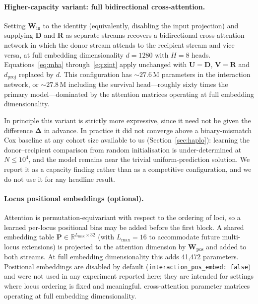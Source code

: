 \documentclass[11pt,a4paper]{article}
\begin{document}
\paragraph{Higher-capacity variant: full bidirectional cross-attention.}
Setting $\mathbf{W}_{\mathrm{in}}$ to the identity (equivalently, disabling the
input projection) and supplying $\mathbf{D}$ and $\mathbf{R}$ as separate
streams recovers a bidirectional cross-attention network in which the donor
stream attends to the recipient stream and vice versa, at full embedding
dimensionality $d = 1280$ with $H = 8$ heads.  Equations~\eqref{eq:mha}
through~\eqref{eq:zint} apply unchanged with $\mathbf{U} = \mathbf{D}$,
$\mathbf{V} = \mathbf{R}$ and $d_{\mathrm{proj}}$ replaced by $d$.  This
configuration has ${\sim}27.6$\,M parameters in the interaction network, or
${\sim}27.8$\,M including the survival head---roughly sixty times the primary
model---dominated by the attention matrices operating at full embedding
dimensionality.

In principle this variant is strictly more expressive, since it need not be
given the difference $\boldsymbol{\Delta}$ in advance.  In practice it did not
converge above a binary-mismatch Cox baseline at any cohort size available to
us (Section~\ref{sec:haplo}): learning the donor--recipient comparison from
random initialisation is under-determined at $N \le 10^4$, and the model
remains near the trivial uniform-prediction solution.  We report it as a
capacity finding rather than as a competitive configuration, and we do not use
it for any headline result.

\paragraph{Locus positional embeddings (optional).}
Attention is permutation-equivariant with respect to the ordering of loci, so
a learned per-locus positional bias may be added before the first block.  A
shared embedding table $\mathbf{P} \in \mathbb{R}^{L_{\max} \times 32}$ (with
$L_{\max} = 16$ to accommodate future multi-locus extensions) is projected to
the attention dimension by $\mathbf{W}_{\mathrm{pos}}$ and added to both
streams.  At full embedding dimensionality this adds 41{,}472 parameters.
Positional embeddings are disabled by default
(\texttt{interaction\_pos\_embed: false}) and were not used in any experiment
reported here; they are intended for settings where locus ordering is fixed
and meaningful.
cross-attention parameter matrices operating at full embedding dimensionality.
\end{document}
